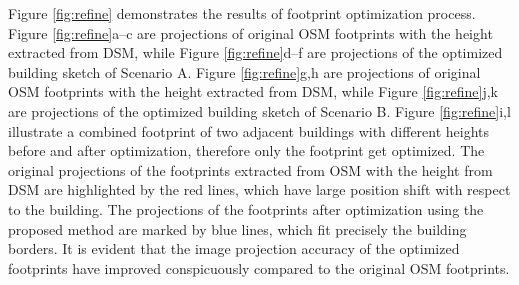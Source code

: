 Figure \ref{fig:refine} demonstrates the results of footprint optimization process. Figure \ref{fig:refine}a--c are projections of original OSM footprints with the height extracted from DSM, while Figure \ref{fig:refine}d--f are projections of the optimized building sketch of Scenario A. Figure \ref{fig:refine}g,h are projections of original OSM footprints with the height extracted from DSM, while Figure \ref{fig:refine}j,k are projections of the optimized building sketch of Scenario B. Figure \ref{fig:refine}i,l illustrate a combined footprint of two adjacent buildings with different heights before and after optimization, therefore only the footprint get optimized. The original projections of the footprints extracted from OSM with the height from DSM are highlighted by the red lines, which have large position shift with respect to the building. The projections of the footprints after optimization using the proposed method are marked by blue lines, which fit precisely the building borders. It is evident that the image projection accuracy of the optimized footprints have improved conspicuously compared to the original OSM footprints. 


